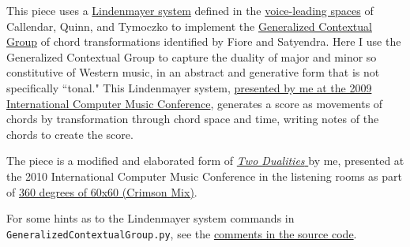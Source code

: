 \documentclass[letterpaper,10pt,DIV=12,parskip=half]{scrartcl}
\begin{document}
This piece uses a \href{https://algorithmicbotany.org/papers/abop/abop.pdf}{Lindenmayer system} defined in the \href{https://dmitri.mycpanel.princeton.edu/files/publications/science2.pdf}{voice-leading spaces} of Callendar, Quinn, and Tymoczko to implement the \href{https://www.mtosmt.org/issues/mto.05.11.3/mto.05.11.3.fiore_satyendra.pdf}{Generalized Contextual Group} of chord transformations identified by Fiore and Satyendra. Here I use the Generalized Contextual Group to capture the duality of major and minor so constitutive of Western music, in an abstract and generative form that is not specifically ``tonal." This Lindenmayer system, \href{https://citeseerx.ist.psu.edu/document?repid=rep1&type=pdf&doi=dd8623bbe8c889b2c56d6a1fc0fc55c61b362ee4}{presented by me at the 2009 International Computer Music Conference}, generates a score as movements of chords by transformation through chord space and time, writing notes of the chords to create the score. 

The piece is a modified and elaborated form of \href{https://music.youtube.com/watch?v=3_ahbL44p-E}{\emph{Two Dualities} }by me, presented at the 2010 International Computer Music Conference in the listening rooms as part of \href{http://www.voxnovus.com/60x60/2010_Crimson_Mix.htm}{360 degrees of 60x60 (Crimson Mix)}.

For some hints as to the Lindenmayer system commands in \lstinline|GeneralizedContextualGroup.py|, see the \href{https://github.com/gogins/csound-ac/blob/master/silencio/python/GeneralizedContextualGroup.py}{comments in the source code}.
\end{document}
